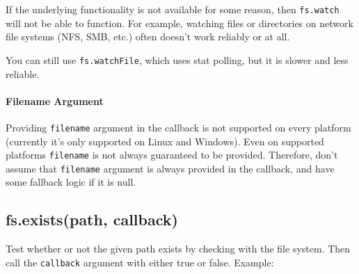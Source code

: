 If the underlying functionality is not available for some reason, then
\texttt{fs.watch} will not be able to function. For example, watching
files or directories on network file systems (NFS, SMB, etc.) often
doesn't work reliably or at all.

You can still use \texttt{fs.watchFile}, which uses stat polling, but it
is slower and less reliable.

\paragraph{Filename Argument}\label{filename-argument}

Providing \texttt{filename} argument in the callback is not supported on
every platform (currently it's only supported on Linux and Windows).
Even on supported platforms \texttt{filename} is not always guaranteed
to be provided. Therefore, don't assume that \texttt{filename} argument
is always provided in the callback, and have some fallback logic if it
is null.

\begin{Shaded}
\begin{Highlighting}[]
\NormalTok{(}\NormalTok{, } 
  \NormalTok{(} 
   
    \NormalTok{(} 
  \NormalTok{\} } \NormalTok{\{}
    \NormalTok{(}\NormalTok{);}
  \NormalTok{\}}
\NormalTok{\});}
\end{Highlighting}
\end{Shaded}

\subsection{fs.exists(path, callback)}\label{fs.existspath-callback}

Test whether or not the given path exists by checking with the file
system. Then call the \texttt{callback} argument with either true or
false. Example:

\begin{Shaded}
\begin{Highlighting}[]
\NormalTok{(}\NormalTok{, } 
   \NormalTok{: }\NormalTok{);}
\NormalTok{\});}
\end{Highlighting}
\end{Shaded}

